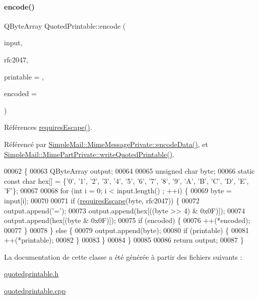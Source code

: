 \paragraph{\texorpdfstring{encode()}{encode()}}
{\footnotesize\ttfamily Q\+Byte\+Array Quoted\+Printable\+::encode (\begin{DoxyParamCaption}\item[{const Q\+Byte\+Array \&}]{input,  }\item[{bool}]{rfc2047,  }\item[{int $\ast$}]{printable = {},  }\item[{int $\ast$}]{encoded = {} }\end{DoxyParamCaption})\hspace{0.3cm}{\ttfamily [static]}}



Références \hyperlink{quotedprintable_8cpp_a499595d3c37138682b9419204804a7f7}{requires\+Escape()}.



Référencé par \hyperlink{class_simple_mail_1_1_mime_message_private_ae036b2417205ef25181091bebd15c0f6}{Simple\+Mail\+::\+Mime\+Message\+Private\+::encode\+Data()}, et \hyperlink{class_simple_mail_1_1_mime_part_private_a075937d19cf60c10f765154aa30fa4b6}{Simple\+Mail\+::\+Mime\+Part\+Private\+::write\+Quoted\+Printable()}.


\begin{DoxyCode}
00062 \{
00063     QByteArray output;
00064 
00065     \textcolor{keywordtype}{unsigned} \textcolor{keywordtype}{char} byte;
00066     \textcolor{keyword}{static} \textcolor{keyword}{const} \textcolor{keywordtype}{char} hex[] = \{\textcolor{charliteral}{'0'}, \textcolor{charliteral}{'1'}, \textcolor{charliteral}{'2'}, \textcolor{charliteral}{'3'}, \textcolor{charliteral}{'4'}, \textcolor{charliteral}{'5'}, \textcolor{charliteral}{'6'}, \textcolor{charliteral}{'7'}, \textcolor{charliteral}{'8'}, \textcolor{charliteral}{'9'}, \textcolor{charliteral}{'A'}, \textcolor{charliteral}{'B'}, \textcolor{charliteral}{'C'}, \textcolor{charliteral}{'D'}, \textcolor{charliteral}{'E'}, \textcolor{charliteral}{
      'F'}\};
00067 
00068     \textcolor{keywordflow}{for} (\textcolor{keywordtype}{int} i = 0; i < input.length() ; ++i) \{
00069         byte = input[i];
00070 
00071         \textcolor{keywordflow}{if} (\hyperlink{quotedprintable_8cpp_a499595d3c37138682b9419204804a7f7}{requiresEscape}(byte, rfc2047)) \{
00072             output.append(\textcolor{charliteral}{'='});
00073             output.append(hex[((byte >> 4) & 0x0F)]);
00074             output.append(hex[(byte & 0x0F)]);
00075             \textcolor{keywordflow}{if} (encoded) \{
00076                 ++(*encoded);
00077             \}
00078         \} \textcolor{keywordflow}{else} \{
00079             output.append(byte);
00080             \textcolor{keywordflow}{if} (printable) \{
00081                 ++(*printable);
00082             \}
00083         \}
00084     \}
00085 
00086     \textcolor{keywordflow}{return} output;
00087 \}
\end{DoxyCode}


La documentation de cette classe a été générée à partir des fichiers suivants \+:\begin{DoxyCompactItemize}
\item 
\hyperlink{quotedprintable_8h}{quotedprintable.\+h}\item 
\hyperlink{quotedprintable_8cpp}{quotedprintable.\+cpp}\end{DoxyCompactItemize}
